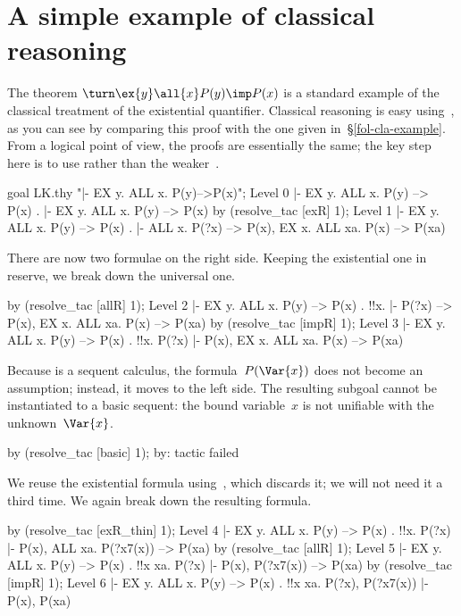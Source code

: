 \section{A simple example of classical reasoning} 
The theorem $\turn\ex{y}\all{x}P(y)\imp P(x)$ is a standard example of the
classical treatment of the existential quantifier.  Classical reasoning
is easy using~{\LK}, as you can see by comparing this proof with the one
given in~\S\ref{fol-cla-example}.  From a logical point of view, the
proofs are essentially the same; the key step here is to use 
rather than the weaker~.
\begin{ttbox}
goal LK.thy "|- EX y. ALL x. P(y)-->P(x)";
{\out Level 0}
{\out  |- EX y. ALL x. P(y) --> P(x)}
{.  |- EX y. ALL x. P(y) --> P(x)}
by (resolve_tac [exR] 1);
{\out Level 1}
{\out  |- EX y. ALL x. P(y) --> P(x)}
{.  |- ALL x. P(?x) --> P(x), EX x. ALL xa. P(x) --> P(xa)}
\end{ttbox}
There are now two formulae on the right side.  Keeping the existential one
in reserve, we break down the universal one.
\begin{ttbox}
by (resolve_tac [allR] 1);
{\out Level 2}
{\out  |- EX y. ALL x. P(y) --> P(x)}
{. !!x.  |- P(?x) --> P(x), EX x. ALL xa. P(x) --> P(xa)}
by (resolve_tac [impR] 1);
{\out Level 3}
{\out  |- EX y. ALL x. P(y) --> P(x)}
{. !!x. P(?x) |- P(x), EX x. ALL xa. P(x) --> P(xa)}
\end{ttbox}
Because {\LK} is a sequent calculus, the formula~$P(\Var{x})$ does not
become an assumption;  instead, it moves to the left side.  The
resulting subgoal cannot be instantiated to a basic sequent: the bound
variable~$x$ is not unifiable with the unknown~$\Var{x}$.
\begin{ttbox}
by (resolve_tac [basic] 1);
{\out by: tactic failed}
\end{ttbox}
We reuse the existential formula using~, which discards
it; we will not need it a third time.  We again break down the resulting
formula.
\begin{ttbox}
by (resolve_tac [exR_thin] 1);
{\out Level 4}
{\out  |- EX y. ALL x. P(y) --> P(x)}
{. !!x. P(?x) |- P(x), ALL xa. P(?x7(x)) --> P(xa)}
by (resolve_tac [allR] 1);
{\out Level 5}
{\out  |- EX y. ALL x. P(y) --> P(x)}
{. !!x xa. P(?x) |- P(x), P(?x7(x)) --> P(xa)}
by (resolve_tac [impR] 1);
{\out Level 6}
{\out  |- EX y. ALL x. P(y) --> P(x)}
{. !!x xa. P(?x), P(?x7(x)) |- P(x), P(xa)}
\end{ttbox}
